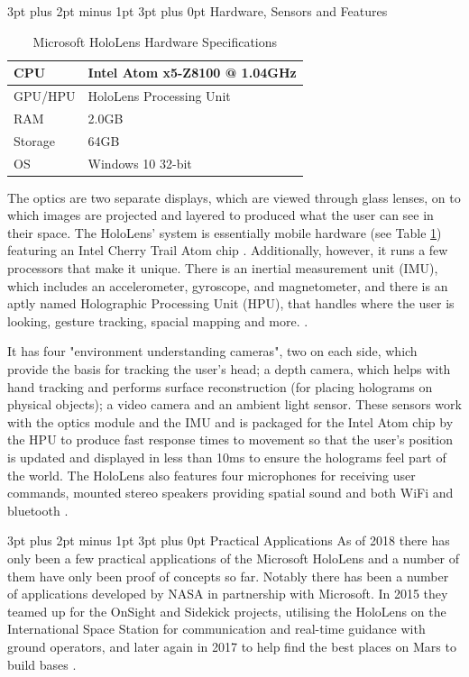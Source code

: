 \documentclass[12pt,a4paper]{article}
\makeatletter
\renewcommand\paragraph{\@startsection {paragraph}{1}{0mm} %
	                           {3pt plus 2pt minus 1pt} %
	                           {3pt plus 0pt} %
	                           {\normalfont}}
\makeatother
\begin{document}
\paragraph{Hardware, Sensors and Features}
\begin{table}[!h]
	\renewcommand{\arraystretch}{1.3}
	\caption{Microsoft HoloLens Hardware Specifications}
	\label{hardware}
	\centering
	\begin{tabular}{l|l}
		\toprule
		CPU & Intel Atom x5-Z8100 @ 1.04GHz\\ \hline
		GPU/HPU & HoloLens Processing Unit \\ \hline
		RAM & 2.0GB\\ \hline
		Storage & 64GB\\ \hline
		OS & Windows 10 32-bit\\ \bottomrule
	\end{tabular}
\end{table}
The optics are two separate displays, which are viewed through glass lenses, on to which images are projected and layered to produced what the user can see in their space. The HoloLens' system is essentially mobile hardware (see Table \ref{hardware}) featuring an Intel Cherry Trail Atom chip \cite{rubino16}. Additionally, however, it runs a few processors that make it unique. There is an inertial measurement unit (IMU), which includes an accelerometer, gyroscope, and magnetometer, and there is an aptly named Holographic Processing Unit (HPU), that handles where the user is looking, gesture tracking, spacial mapping and more. \cite{holmdahl15}.

It has four "environment understanding cameras", two on each side, which provide the basis for tracking the user's head; a depth camera, which helps with hand tracking and performs surface reconstruction (for placing holograms on physical objects); a video camera and an ambient light sensor. These sensors work with the optics module and the IMU and is packaged for the Intel Atom chip by the HPU to produce fast response times to movement so that the user's position is updated and displayed in less than 10ms to ensure the holograms feel part of the world. The HoloLens also features four microphones for receiving user commands, mounted stereo speakers providing spatial sound and both WiFi and bluetooth \cite{colaner16}.

\paragraph{Practical Applications}
As of 2018 there has only been a few practical applications of the Microsoft HoloLens and a number of them have only been proof of concepts so far. Notably there has been a number of applications developed by NASA in partnership with Microsoft. In 2015 they teamed up for the OnSight and Sidekick projects, utilising the HoloLens on the International Space Station for communication and real-time guidance with ground operators, and later again in 2017 to help find the best places on Mars to build bases \cite{nasa15, microsoftnews17}.
\end{document}
